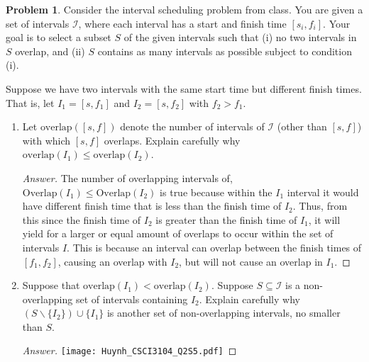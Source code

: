 \documentclass[11pt]{article}
\theoremstyle{definition}
\theoremstyle{definition}
\newtheorem{required}{Problem}
\theoremstyle{definition}
\begin{document}
\setcounter{required}{4}
\begin{required} 
Consider the interval scheduling problem from class. You are given a set of intervals $\mathcal{I}$, where each interval has a start and finish time $[s_i, f_i]$. Your goal is to select a subset $S$ of the given intervals such that (i) no two intervals in $S$ overlap, and (ii) $S$ contains as many intervals as possible subject to condition (i). 

Suppose we have two intervals with the same start time but different finish times. That is, let $I_{1} = [s, f_{1}]$ and $I_{2} = [s, f_{2}]$ with $f_{2} > f_{1}$. 
\begin{enumerate}[label=(\alph*)]
\item Let $\text{overlap}([s, f])$ denote the number of intervals of $\mathcal{I}$ (other than $[s, f]$) with which $[s, f]$ overlaps. Explain carefully why $\text{overlap}(I_{1}) \leq \text{overlap}(I_{2})$.
\begin{proof}[Answer]
The number of overlapping intervals of, $\text{Overlap}(I_{1}) \leq \text{Overlap}(I_{2})$ is true because within the $I_1$ interval it would have different finish time that is less than the finish time of $I_2$. Thus, from this since the finish time of $I_2$ is greater than the finish time of $I_1$, it will yield for a larger or equal amount of overlaps to occur within the set of intervals $I$. This is because an interval can overlap between the finish times of  $[f_1, f_2]$, causing an overlap with $I_2$, but will not cause an overlap in $I_1$.
\end{proof}


\vskip 50pt
\item Suppose that $\text{overlap}(I_{1}) < \text{overlap}(I_{2})$. Suppose $S \subseteq \mathcal{I}$ is a non-overlapping set of intervals containing $I_2$. Explain carefully why $(S \backslash \{I_2\}) \cup \{I_1\}$ is another set of non-overlapping intervals, no smaller than $S$.
\begin{proof}[Answer]
\texttt{[image: Huynh\_CSCI3104\_Q2S5.pdf]}
\end{proof}
\end{enumerate}
\end{required}



\end{document}
